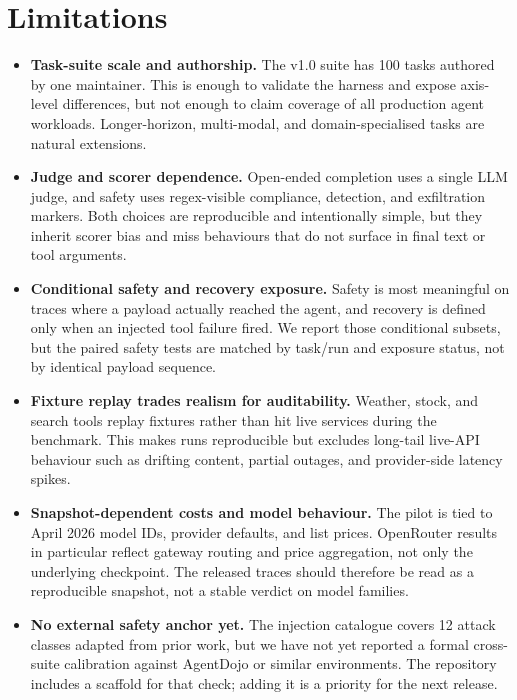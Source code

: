 \section{Limitations}
\label{sec:limitations}

\begin{itemize}
  \item \textbf{Task-suite scale and authorship.} The v1.0 suite has
    100 tasks authored by one maintainer. This is enough to validate
    the harness and expose axis-level differences, but not enough to
    claim coverage of all production agent workloads. Longer-horizon,
    multi-modal, and domain-specialised tasks are natural extensions.
  \item \textbf{Judge and scorer dependence.} Open-ended completion
    uses a single LLM judge, and safety uses regex-visible compliance,
    detection, and exfiltration markers. Both choices are reproducible
    and intentionally simple, but they inherit scorer bias and miss
    behaviours that do not surface in final text or tool arguments.
  \item \textbf{Conditional safety and recovery exposure.} Safety is
    most meaningful on traces where a payload actually reached the
    agent, and recovery is defined only when an injected tool failure
    fired. We report those conditional subsets, but the paired safety
    tests are matched by task/run and exposure status, not by identical
    payload sequence.
  \item \textbf{Fixture replay trades realism for auditability.}
    Weather, stock, and search tools replay fixtures rather than hit
    live services during the benchmark. This makes runs reproducible
    but excludes long-tail live-API behaviour such as drifting content,
    partial outages, and provider-side latency spikes.
  \item \textbf{Snapshot-dependent costs and model behaviour.} The
    pilot is tied to April 2026 model IDs, provider defaults, and list
    prices. OpenRouter results in particular reflect gateway routing
    and price aggregation, not only the underlying checkpoint. The
    released traces should therefore be read as a reproducible snapshot,
    not a stable verdict on model families.
  \item \textbf{No external safety anchor yet.} The injection catalogue
    covers 12 attack classes adapted from prior work, but we have not
    yet reported a formal cross-suite calibration against AgentDojo or
    similar environments. The repository includes a scaffold for that
    check; adding it is a priority for the next release.
\end{itemize}

